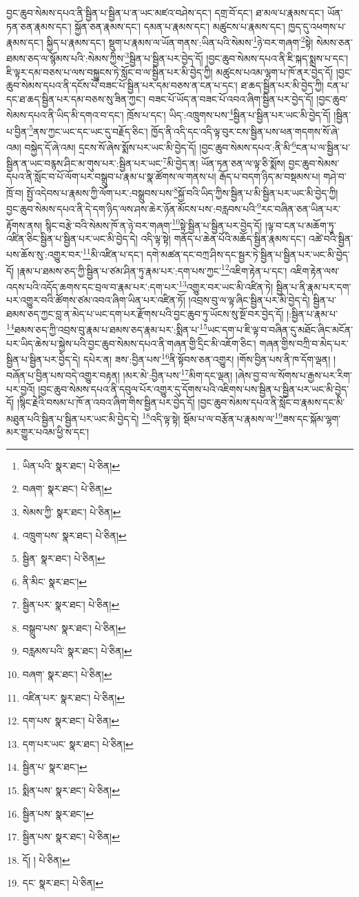 བྱང་ཆུབ་སེམས་དཔའ་ནི་སྦྱིན་པ་སྦྱིན་པ་ན་ཡང་མཛའ་བཤེས་དང་། དགྲ་བོ་དང་། ཐ་མལ་པ་རྣམས་དང་། ཡོན་ཏན་ཅན་རྣམས་དང་། སྐྱོན་ཅན་རྣམས་དང་། དམན་པ་རྣམས་དང་། མཚུངས་པ་རྣམས་དང་། ཁྱད་དུ་འཕགས་པ་རྣམས་དང་། སྐྱིད་པ་རྣམས་དང་། སྡུག་པ་རྣམས་ལ་ཡོན་གནས་:ཡིན་པའི་སེམས་\footnote{ཡིན་པའི་  སྣར་ཐང་།  པེ་ཅིན། }ཉེ་བར་གཞག་\footnote{བཞག་  སྣར་ཐང་།  པེ་ཅིན། }སྟེ། སེམས་ཅན་ཐམས་ཅད་ལ་སྙོམས་པའི་:སེམས་ཀྱིས་\footnote{སེམས་ཀྱི་  སྣར་ཐང་།  པེ་ཅིན། }སྦྱིན་པ་སྦྱིན་པར་བྱེད་དོ། །བྱང་ཆུབ་སེམས་དཔའ་ནི་ཇི་སྐད་སྨྲས་པ་དང་། ཇི་ལྟར་དམ་བཅས་པ་ལས་བསྐྱུངས་ཏེ་སློང་བ་ལ་སྦྱིན་པར་མི་བྱེད་ཀྱི། མཚུངས་པའམ་ལྷག་པ་ཁོ་ནར་བྱེད་དོ། །བྱང་ཆུབ་སེམས་དཔའ་ནི་དངོས་པོ་བཟང་པོ་སྦྱིན་པར་དམ་བཅས་ན་ངན་པ་དང་། ཐ་ཆད་སྦྱིན་པར་མི་བྱེད་ཀྱི། ངན་པ་དང་ཐ་ཆད་སྦྱིན་པར་དམ་བཅས་སུ་ཟིན་ཀྱང་། བཟང་པོ་ཡོད་ན་བཟང་པོ་འབའ་ཞིག་སྦྱིན་པར་བྱེད་དོ། །བྱང་ཆུབ་སེམས་དཔའ་ནི་ཡིད་མི་དགའ་བ་དང་། ཁྲོས་པ་དང་། ཡིད་:འཁྲུགས་པས་\footnote{འཁྲུག་པས་  སྣར་ཐང་།  པེ་ཅིན། }སྦྱིན་པ་སྦྱིན་པར་ཡང་མི་བྱེད་དོ། །སྦྱིན་པ་བྱིན་\footnote{སྦྱིན་  སྣར་ཐང་།  པེ་ཅིན། }ནས་ཀྱང་ཡང་དང་ཡང་དུ་བརྗོད་ཅིང་། ཁྱོད་ནི་འདི་དང་འདི་ལྟ་བུར་ངས་སྦྱིན་པས་ཕན་གདགས་སོ་ཞེ་འམ། བསྐྱེད་དོ་ཞེ་འམ། དྲངས་སོ་ཞེས་སྨོས་པར་ཡང་མི་བྱེད་དོ། །བྱང་ཆུབ་སེམས་དཔའ་:ནི་མི་\footnote{ནི་མིང་  སྣར་ཐང་། }ངན་པ་ལ་སྦྱིན་པ་སྦྱིན་ན་ཡང་བརྙས་ཤིང་མ་གུས་པར་:སྦྱིན་པར་ཡང་\footnote{སྦྱིན་པར་  སྣར་ཐང་།  པེ་ཅིན། }མི་བྱེད་ན། ཡོན་ཏན་ཅན་ལ་ལྟ་ཅི་སྨོས། བྱང་ཆུབ་སེམས་དཔའ་ནི་སློང་བ་པོ་ལོག་པར་བསྒྲུབ་པ་རྣམ་པ་སྣ་ཚོགས་ལ་གནས་པ། རྒོད་པ་བདག་ཉིད་མ་བསྡམས་པ། གཤེ་བ་ཁྲོ་བ། སྤྱོ་འདེབས་པ་རྣམས་ཀྱི་ལོག་པར་:བསྒྲུབས་པས་\footnote{བསྒྲུབ་པས་  སྣར་ཐང་།  པེ་ཅིན། }སྐྱོ་བའི་ཡིད་ཀྱིས་སྦྱིན་པ་མི་སྦྱིན་པར་ཡང་མི་བྱེད་ཀྱི། བྱང་ཆུབ་སེམས་དཔའ་ནི་དེ་དག་ཉིད་ལས་ཤས་ཆེར་ཉོན་མོངས་པས་:བརླབས་པའི་\footnote{བརླམས་པའི་  སྣར་ཐང་།  པེ་ཅིན། }རང་བཞིན་ཅན་ཡིན་པར་རྟོགས་ནས། སྙིང་བརྩེ་བའི་སེམས་ཁོ་ན་ཉེ་བར་གཞག་\footnote{བཞག་  སྣར་ཐང་།  པེ་ཅིན། }སྟེ་སྦྱིན་པ་སྦྱིན་པར་བྱེད་དོ། །ལྟ་བ་ངན་པ་མཆོག་ཏུ་འཛིན་ཅིང་སྦྱིན་པ་སྦྱིན་པར་ཡང་མི་བྱེད་དེ། འདི་ལྟ་སྟེ། གནོད་པ་ཆེན་པོའི་མཆོད་སྦྱིན་རྣམས་དང་། འཚེ་བའི་སྦྱིན་པས་ཆོས་སུ་:འགྱུར་བར་\footnote{འཛིན་པར་  སྣར་ཐང་།  པེ་ཅིན། }མི་འཛིན་པ་དང་། དགེ་མཚན་དང་བཀྲ་ཤིས་དང་སྦྱར་ཏེ་སྦྱིན་པ་སྦྱིན་པར་ཡང་མི་བྱེད་དོ། །རྣམ་པ་ཐམས་ཅད་ཀྱི་སྦྱིན་པ་ཙམ་ཤིན་ཏུ་རྣམ་པར་:དག་པས་ཀྱང་\footnote{དག་པས་  སྣར་ཐང་།  པེ་ཅིན། }འཇིག་རྟེན་པ་དང་། འཇིག་རྟེན་ལས་འདས་པའི་འདོད་ཆགས་དང་བྲལ་བ་རྣམ་པར་:དག་པར་\footnote{དག་པར་ཡང་  སྣར་ཐང་།  པེ་ཅིན། }འགྱུར་བར་ཡང་མི་འཛིན་ཏེ། སྦྱིན་པ་ནི་རྣམ་པར་དག་པར་འགྱུར་བའི་ཚོགས་ཙམ་འབའ་ཞིག་ཡིན་པར་འཛིན་ཏོ། །འབྲས་བུ་ལ་ལྟ་ཞིང་སྦྱིན་པར་མི་བྱེད་དེ། སྦྱིན་པ་ཐམས་ཅད་ཀྱང་བླ་ན་མེད་པ་ཡང་དག་པར་རྫོགས་པའི་བྱང་ཆུབ་ཏུ་ཡོངས་སུ་སྔོ་བར་བྱེད་དོ། །:སྦྱིན་པ་རྣམ་པ་\footnote{སྦྱིན་པ་  སྣར་ཐང་། }ཐམས་ཅད་ཀྱི་འབྲས་བུ་རྣམ་པ་ཐམས་ཅད་རྣམ་པར་:སྨིན་པ་\footnote{སྨིན་པས་  སྣར་ཐང་།  པེ་ཅིན། }ཡང་དག་པ་ཇི་ལྟ་བ་བཞིན་དུ་མཐོང་ཞིང་མངོན་པར་ཡིད་ཆེས་པ་སྐྱེས་པའི་བྱང་ཆུབ་སེམས་དཔའ་ནི་གཞན་གྱི་དྲིང་མི་འཇོག་ཅིང་། གཞན་གྱིས་བཀྲི་བ་མེད་པར་སྦྱིན་པ་སྦྱིན་པར་བྱེད་དེ། དཔེར་ན། ཟས་:བྱིན་པས་\footnote{སྦྱིན་པས་  སྣར་ཐང་། }ནི་སྟོབས་ཅན་འགྱུར། །གོས་བྱིན་པས་ནི་ཁ་དོག་ལྡན། །བཞོན་པ་བྱིན་པས་བདེ་འགྱུར་བརྟན། །མར་མེ་:བྱིན་པས་\footnote{སྦྱིན་པས་  སྣར་ཐང་།  པེ་ཅིན། }མིག་དང་ལྡན། །ཞེས་བྱ་བ་ལ་སོགས་པ་རྒྱས་པར་རིག་པར་བྱའོ། །བྱང་ཆུབ་སེམས་དཔའ་ནི་དབུལ་པོར་འགྱུར་དུ་དོགས་པའི་འཇིགས་པས་སྦྱིན་པ་སྦྱིན་པར་ཡང་མི་བྱེད་དོ། །སྙིང་རྗེའི་བསམ་པ་ཁོ་ན་འབའ་ཞིག་གིས་སྦྱིན་པར་བྱེད་དོ། །བྱང་ཆུབ་སེམས་དཔའ་ནི་སློང་བ་རྣམས་དང་མི་མཐུན་པའི་སྦྱིན་པ་སྦྱིན་པར་ཡང་མི་བྱེད་དེ། \footnote{དོ། །   པེ་ཅིན། }འདི་ལྟ་སྟེ། སྡོམ་པ་ལ་བརྩོན་པ་རྣམས་ལ་\footnote{དང་  སྣར་ཐང་།  པེ་ཅིན། }ཟས་དང་སྐོམ་ལྷག་མར་གྱུར་པའམ་ཕྱི་ས་དང་། 